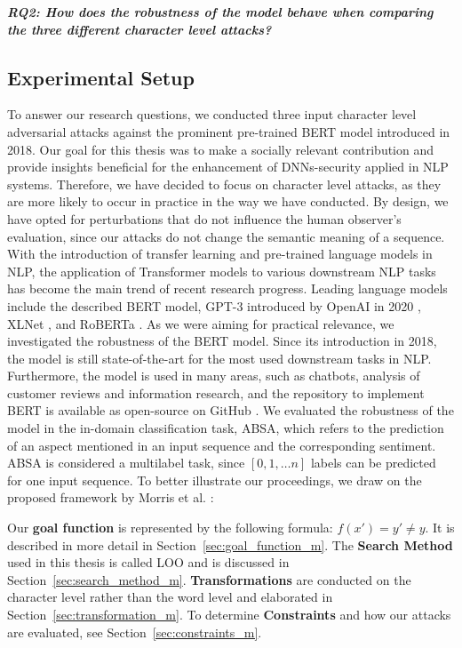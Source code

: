 \textbf{\textit{RQ2: How does the robustness of the model behave when comparing the three different character level attacks?}}



\subsection{Experimental Setup} 
To answer our research questions, we conducted three input character level adversarial attacks against the prominent pre-trained BERT model introduced in 2018. 
Our goal for this thesis was to make a socially relevant contribution and provide insights beneficial for the enhancement of DNNs-security applied in NLP systems. Therefore, we have decided to focus on character level attacks, as they are more likely to occur in practice in the way we have conducted. By design, we have opted for perturbations that do not influence the human observer's evaluation, since our attacks do not change the semantic meaning of a sequence. 
With the introduction of transfer learning and pre-trained language models in NLP, the application of Transformer models to various downstream NLP tasks has become the main trend of recent research progress. Leading language models include the described BERT model, GPT-3 introduced by OpenAI in 2020 \cite{brown2020language}, XLNet \cite{yang2019xlnet}, and RoBERTa \cite{liu2019roberta}. As we were aiming for practical relevance, we investigated the robustness of the BERT model. Since its introduction in 2018, the model is still state-of-the-art for the most used downstream tasks in NLP. Furthermore, the model is used in many areas, such as chatbots, analysis of customer reviews and information research, and the repository to implement BERT is available as open-source on GitHub \cite{tum_2020}.  
We evaluated the robustness of the model in the in-domain classification task, ABSA, which refers to the prediction of an aspect mentioned in an input sequence and the corresponding sentiment. ABSA is considered a multilabel task, since $[0,1, \dots n]$ labels can be predicted for one input sequence. To better illustrate our proceedings, we draw on the proposed framework by Morris et al. \cite{morris2020textattack}:

Our \textbf{goal function} is represented by the following formula: ${f( x' ) = y' \neq y}$.
It is described in more detail in Section~\ref{sec:goal_function_m}. The \textbf{Search Method} used in this thesis is called LOO and is discussed in Section~\ref{sec:search_method_m}. \textbf{Transformations} are conducted on the character level rather than the word level and elaborated in Section~\ref{sec:transformation_m}. To determine \textbf{Constraints} and how our attacks are evaluated, see Section~\ref{sec:constraints_m}.


